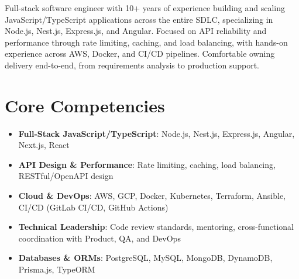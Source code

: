 \documentclass[11pt,a4paper,sans]{moderncv}
\begin{document}
\makecvtitle


\vspace{6pt}
\small{Full-stack software engineer with 10+ years of experience building and scaling JavaScript/TypeScript applications across the entire SDLC, specializing in Node.js, Nest.js, Express.js, and Angular. Focused on API reliability and performance through rate limiting, caching, and load balancing, with hands-on experience across AWS, Docker, and CI/CD pipelines. Comfortable owning delivery end-to-end, from requirements analysis to production support.}


\section{Core Competencies}
\vspace{1pt}
\begin{itemize}

\item \textbf{Full-Stack JavaScript/TypeScript}: Node.js, Nest.js, Express.js, Angular, Next.js, React

\item \textbf{API Design \& Performance}: Rate limiting, caching, load balancing, RESTful/OpenAPI design

\item \textbf{Cloud \& DevOps}: AWS, GCP, Docker, Kubernetes, Terraform, Ansible, CI/CD (GitLab CI/CD, GitHub Actions)

\item \textbf{Technical Leadership}: Code review standards, mentoring, cross-functional coordination with Product, QA, and DevOps

\item \textbf{Databases \& ORMs}: PostgreSQL, MySQL, MongoDB, DynamoDB, Prisma.js, TypeORM

\end{itemize}

\end{document}
